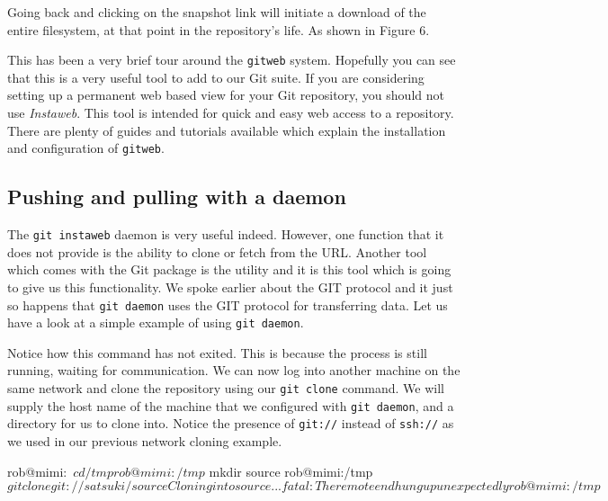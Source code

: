 
Going back and clicking on the snapshot link will initiate a download of the entire filesystem, at that point in the repository's life.
As shown in Figure 6.


This has been a very brief tour around the \texttt{gitweb} system.
Hopefully you can see that this is a very useful tool to add to our Git suite.
If you are considering setting up a permanent web based view for your Git repository, you should not use \emph{Instaweb}.
This tool is intended for quick and easy web access to a repository.
There are plenty of guides and tutorials available which explain the installation and configuration of \texttt{gitweb}.

\subsection{Pushing and pulling with a daemon}
The \texttt{git instaweb} daemon is very useful indeed.
However, one function that it does not provide is the ability to clone or fetch from the URL.
Another tool which comes with the Git package is the  utility and it is this tool which is going to give us this functionality.
We spoke earlier about the GIT protocol and it just so happens that \texttt{git daemon} uses the GIT protocol for transferring data.
Let us have a look at a simple example of using \texttt{git daemon}.


Notice how this command has not exited.
This is because the process is still running, waiting for communication.
We can now log into another machine on the same network and clone the repository using our \texttt{git clone} command.
We will supply the host name of the machine that we configured with \texttt{git daemon}, and a directory for us to clone into.
Notice the presence of \texttt{git://} instead of \texttt{ssh://} as we used in our previous network cloning example.

\begin{code}
rob@mimi:~$ cd /tmp
rob@mimi:/tmp$ mkdir source
rob@mimi:/tmp$ git clone git://satsuki/ source
Cloning into source...
fatal: The remote end hung up unexpectedly
rob@mimi:/tmp$ 
\end{code}

